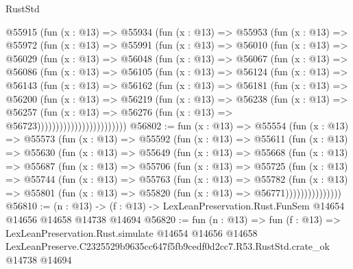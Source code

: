 \begin{lexlean}{RustStd}
\begin{coremodule}
          @55915
            (fun (x : @13) =>
            @55934
              (fun (x : @13) =>
              @55953
                (fun (x : @13) =>
                @55972
                  (fun (x : @13) =>
                  @55991
                    (fun (x : @13) =>
                    @56010
                      (fun (x : @13) =>
                      @56029
                        (fun (x : @13) =>
                        @56048
                          (fun (x : @13) =>
                          @56067
                            (fun (x : @13) =>
                            @56086
                              (fun (x : @13) =>
                              @56105
                                (fun (x : @13) =>
                                @56124
                                  (fun (x : @13) =>
                                  @56143
                                    (fun (x : @13) =>
                                    @56162
                                      (fun (x : @13) =>
                                      @56181
                                        (fun (x : @13) =>
                                        @56200
                                          (fun (x : @13) =>
                                          @56219
                                            (fun (x : @13) =>
                                            @56238
                                              (fun (x : @13) =>
                                              @56257
                                                (fun (x : @13) =>
                                                @56276
                                                  (fun (x : @13) => @56723))))))))))))))))))))))))
@56802 := fun (x : @13) =>
  @55554
    (fun (x : @13) =>
    @55573
      (fun (x : @13) =>
      @55592
        (fun (x : @13) =>
        @55611
          (fun (x : @13) =>
          @55630
            (fun (x : @13) =>
            @55649
              (fun (x : @13) =>
              @55668
                (fun (x : @13) =>
                @55687
                  (fun (x : @13) =>
                  @55706
                    (fun (x : @13) =>
                    @55725
                      (fun (x : @13) =>
                      @55744
                        (fun (x : @13) =>
                        @55763
                          (fun (x : @13) =>
                          @55782
                            (fun (x : @13) =>
                            @55801 (fun (x : @13) => @55820 (fun (x : @13) => @56771)))))))))))))))
@56810 := (n : @13) ->
  (f : @13) -> LexLeanPreservation.Rust.FunSem @14654 @14656 @14658 @14738 @14694
@56820 := fun (n : @13) =>
  fun (f : @13) =>
  LexLeanPreservation.Rust.simulate
    @14654
    @14656
    @14658
    LexLeanPreserve.C2325529b9635cc647f5fb9cedf0d2cc7.R53.RustStd.crate_ok
    @14738
    @14694
\end{coremodule}
\end{lexlean}

